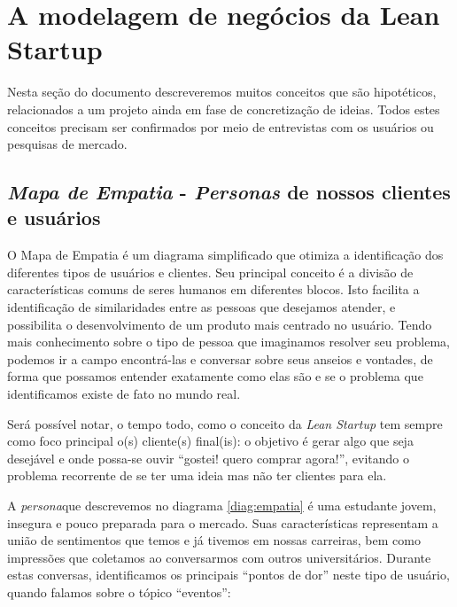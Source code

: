 \documentclass[12pt,a4paper,twoside,hyphens,english,brazil]{abntex2}
\newcommand{\hip}{{\color{BlueViolet}\framebox[1.1\width]{HIP}}}
\newcommand{\conf}{{\color{OliveGreen}\framebox[1.1\width]{CNF}}}
\begin{document}

\section{A modelagem de negócios da Lean Startup} \label{sec:modelagem-negocios}

Nesta seção do documento descreveremos muitos conceitos que são hipotéticos, relacionados a um projeto ainda em fase de concretização de ideias. Todos estes conceitos precisam ser confirmados por meio de entrevistas com os usuários ou pesquisas de mercado.\\


\subsection{\emph{Mapa de Empatia} - \emph{Personas} de nossos clientes e usuários}
O Mapa de Empatia\cite{mapa-de-empatia} é um diagrama simplificado que otimiza a identificação dos diferentes tipos de usuários e clientes. Seu principal conceito é a divisão de características comuns de seres humanos em diferentes blocos. Isto facilita a identificação de similaridades entre as pessoas que desejamos atender, e possibilita o desenvolvimento de um produto mais centrado no usuário. Tendo mais conhecimento sobre o tipo de pessoa que imaginamos resolver seu problema, podemos ir a campo encontrá-las e conversar sobre seus anseios e vontades, de forma que possamos entender exatamente como elas são e se o problema que identificamos existe de fato no mundo real.

Será possível notar, o tempo todo, como o conceito da \emph{Lean Startup} tem sempre como foco principal o(s) cliente(s) final(is): o objetivo é gerar algo que seja desejável e onde possa-se ouvir ``gostei! quero comprar agora!'', evitando o problema recorrente de se ter uma ideia mas não ter clientes para ela.

A \emph{persona}\footnotemark que descrevemos no diagrama \ref{diag:empatia} é uma estudante jovem, insegura e pouco preparada para o mercado. Suas características representam a união de sentimentos que temos e já tivemos em nossas carreiras, bem como impressões que coletamos ao conversarmos com outros universitários. Durante estas conversas, identificamos os principais ``pontos de dor'' neste tipo de usuário, quando falamos sobre o tópico ``eventos'':
\end{document}
